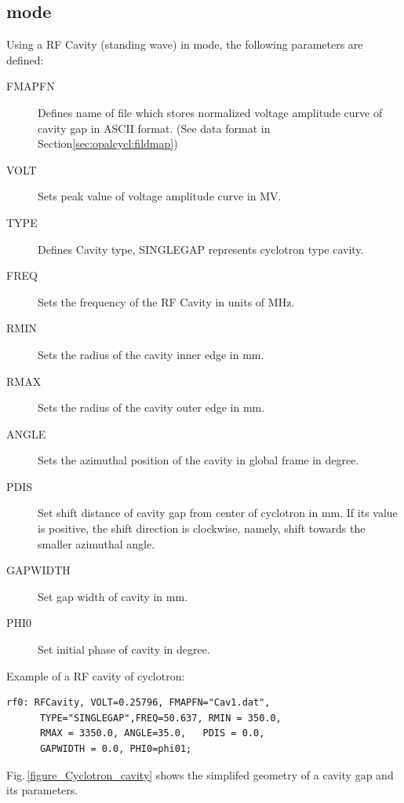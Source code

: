 \subsection{\opalcycl mode}
\label{sec:cavity-cycl}
Using a RF Cavity (standing wave) in \opalcycl mode, the following  parameters are defined:
\begin{description}
\item[FMAPFN]
  Defines name of file which stores normalized voltage amplitude curve of cavity gap in ASCII format.
  (See data format in Section\ref{sec:opalcycl:fildmap})
 \item[VOLT]
  Sets peak value of voltage amplitude curve in MV.
  \item[TYPE]
  Defines Cavity type, SINGLEGAP represents cyclotron type cavity.   
  \item[FREQ]
  Sets the frequency of the RF Cavity in units of MHz. 
  \item[RMIN]
  Sets the radius of the cavity inner edge in mm.
  \item[RMAX]
  Sets the radius of the cavity outer edge in mm.

  \item[ANGLE]
  Sets the azimuthal position of the cavity in global frame in degree. 

  \item[PDIS]
  Set shift distance of cavity gap from center of cyclotron in mm. If its value is positive, 
  the shift direction is clockwise, namely, shift towards the smaller azimuthal angle.
  
  \item[GAPWIDTH]
  Set gap width of  cavity in mm.

  \item[PHI0]
  Set initial phase of cavity in degree.

\end{description}

\noindent Example of a RF cavity of cyclotron:
\begin{verbatim}
rf0: RFCavity, VOLT=0.25796, FMAPFN="Cav1.dat",
      TYPE="SINGLEGAP",FREQ=50.637, RMIN = 350.0,
      RMAX = 3350.0, ANGLE=35.0,   PDIS = 0.0,
      GAPWIDTH = 0.0, PHI0=phi01;
\end{verbatim}

Fig.\,\ref{figure_Cyclotron_cavity} shows the simplifed geometry of a cavity gap and its parameters.

